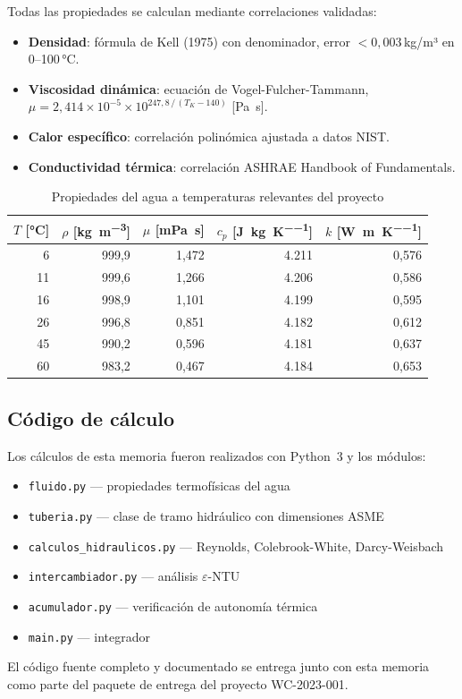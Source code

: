\documentclass[11pt,a4paper]{article}
\begin{document}
Todas las propiedades se calculan mediante correlaciones validadas:
\begin{itemize}
  \item \textbf{Densidad}: fórmula de Kell (1975) con denominador, error $< 0{,}003$\,kg/m³ en 0–100\,°C.
  \item \textbf{Viscosidad dinámica}: ecuación de Vogel-Fulcher-Tammann,
        $\mu = 2{,}414 \times 10^{-5} \times 10^{247{,}8\,/\,(T_K - 140)}$ [\si{\pascal\second}].
  \item \textbf{Calor específico}: correlación polinómica ajustada a datos NIST.
  \item \textbf{Conductividad térmica}: correlación ASHRAE Handbook of Fundamentals.
\end{itemize}

\begin{table}[h!]
\centering
\caption{Propiedades del agua a temperaturas relevantes del proyecto}
\label{tab:propiedades}
\begin{tabular}{@{}rrrrr@{}}
\toprule
$T$ [\si{\celsius}] & $\rho$ [\si{\kilogram\per\cubic\metre}] &
  $\mu$ [\si{\milli\pascal\second}] & $c_p$ [\si{\joule\per\kilogram\per\kelvin}] &
  $k$ [\si{\watt\per\metre\per\kelvin}] \\
\midrule
 6 & 999{,}9 & 1{,}472 & 4.211 & 0{,}576 \\
11 & 999{,}6 & 1{,}266 & 4.206 & 0{,}586 \\
16 & 998{,}9 & 1{,}101 & 4.199 & 0{,}595 \\
26 & 996{,}8 & 0{,}851 & 4.182 & 0{,}612 \\
45 & 990{,}2 & 0{,}596 & 4.181 & 0{,}637 \\
60 & 983{,}2 & 0{,}467 & 4.184 & 0{,}653 \\
\bottomrule
\end{tabular}
\end{table}

\subsection{Código de cálculo}

Los cálculos de esta memoria fueron realizados con Python~3 y los módulos:
\begin{itemize}
  \item \texttt{fluido.py} — propiedades termofísicas del agua
  \item \texttt{tuberia.py} — clase de tramo hidráulico con dimensiones ASME
  \item \texttt{calculos\_hidraulicos.py} — Reynolds, Colebrook-White, Darcy-Weisbach
  \item \texttt{intercambiador.py} — análisis $\varepsilon$-NTU
  \item \texttt{acumulador.py} — verificación de autonomía térmica
  \item \texttt{main.py} — integrador
\end{itemize}

El código fuente completo y documentado se entrega junto con esta memoria como parte del
paquete de entrega del proyecto WC-2023-001.
\end{document}
